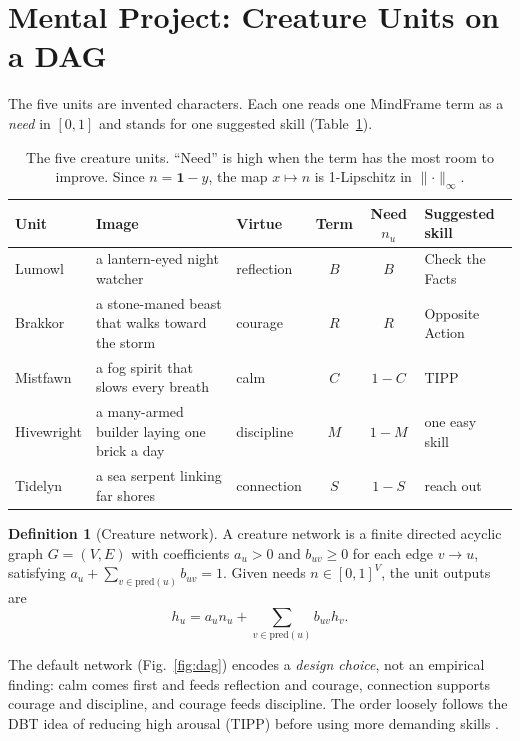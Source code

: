 \documentclass[11pt]{article}
\theoremstyle{definition}
\newtheorem{definition}{Definition}
\theoremstyle{remark}
\newcommand{\one}{\mathbf{1}}
\newcommand{\ninf}[1]{\lVert #1\rVert_\infty}
\begin{document}
\section{Mental Project: Creature Units on a DAG}\label{sec:mental}
The five units are invented characters. Each one reads one MindFrame term as a \emph{need} in $[0,1]$ and stands for one suggested skill (Table~\ref{tab:creatures}).

\begin{table}[h]
\centering\small
\begin{tabular}{@{}l p{5.4cm} l c c l@{}}
\toprule
Unit & Image & Virtue & Term & Need $n_u$ & Suggested skill\\
\midrule
Lumowl & a lantern-eyed night watcher & reflection & $B$ & $B$ & Check the Facts\\
Brakkor & a stone-maned beast that walks toward the storm & courage & $R$ & $R$ & Opposite Action\\
Mistfawn & a fog spirit that slows every breath & calm & $C$ & $1-C$ & TIPP\\
Hivewright & a many-armed builder laying one brick a day & discipline & $M$ & $1-M$ & one easy skill\\
Tidelyn & a sea serpent linking far shores & connection & $S$ & $1-S$ & reach out\\
\bottomrule
\end{tabular}
\caption{The five creature units. ``Need'' is high when the term has the most room to improve. Since $n=\one-y$, the map $x\mapsto n$ is 1-Lipschitz in $\ninf{\cdot}$.}
\label{tab:creatures}
\end{table}

\begin{definition}[Creature network]\label{def:dag}
A creature network is a finite directed acyclic graph $G=(V,E)$ with coefficients $a_u>0$ and $b_{uv}\ge0$ for each edge $v\to u$, satisfying $a_u+\sum_{v\in\mathrm{pred}(u)}b_{uv}=1$. Given needs $n\in[0,1]^V$, the unit outputs are
\[h_u=a_un_u+\sum_{v\in\mathrm{pred}(u)}b_{uv}h_v .\]
\end{definition}

The default network (Fig.~\ref{fig:dag}) encodes a \emph{design choice}, not an empirical finding: calm comes first and feeds reflection and courage, connection supports courage and discipline, and courage feeds discipline. The order loosely follows the DBT idea of reducing high arousal (TIPP) before using more demanding skills \citep{linehan2015}.
\end{document}
